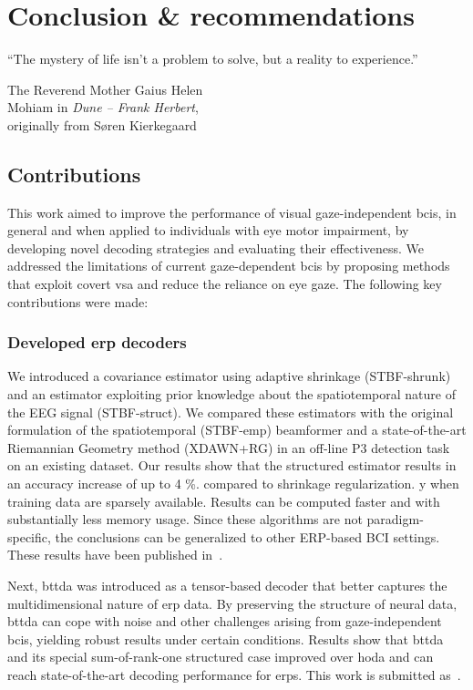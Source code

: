 \chapter{Conclusion \& recommendations}
\epigraph{``The mystery of life isn't a problem to solve, but a reality to
experience.''}{The Reverend Mother Gaius Helen \\ Mohiam in \emph{Dune -- Frank
Herbert}, \\ originally from S{\o}ren Kierkegaard}


\section{Contributions}

This work aimed to improve the performance of visual gaze-independent \acsp{bci}, in general
and when applied to individuals with eye motor impairment, by developing novel decoding
strategies and evaluating their effectiveness.
We addressed the limitations of current gaze-dependent \acp{bci} by proposing methods that
exploit covert \ac{vsa} and reduce the reliance on eye gaze.
The following key contributions were made:

\subsection{Developed \acs{erp} decoders}
\label{sec:conclusion/contrib/decoders}
We introduced a covariance estimator using adaptive shrinkage (STBF-shrunk) and an estimator
exploiting prior knowledge about the spatiotemporal nature of the EEG signal
(STBF-struct).
We compared these estimators with the original formulation of the
spatiotemporal (STBF-emp)
beamformer and a state-of-the-art Riemannian Geometry method (XDAWN+RG) in an off-line P3 detection task on
an existing dataset.
Our results show that the structured estimator results in an accuracy
increase of up to 4 \%. compared to shrinkage regularization.
y when training data are sparsely available.
Results can be computed faster and with
substantially less memory usage.
Since these algorithms are not paradigm-specific, the conclusions can be
generalized to other ERP-based BCI settings.
These results have been published in~\textcite{VanDenKerchove2022}.

Next, \acf{bttda} was introduced as a tensor-based decoder that better captures the
multidimensional nature of \ac{erp} data.
By preserving the structure of neural data, \ac{bttda} can cope with noise and other challenges
arising from gaze-independent \acp{bci}, yielding robust results under certain conditions.
Results show that \ac{bttda} and its special sum-of-rank-one structured case
improved over \ac{hoda} and can reach state-of-the-art decoding performance for
\acp{erp}.
This work is submitted as~\textcite{VanDenKerchove2024a}.

